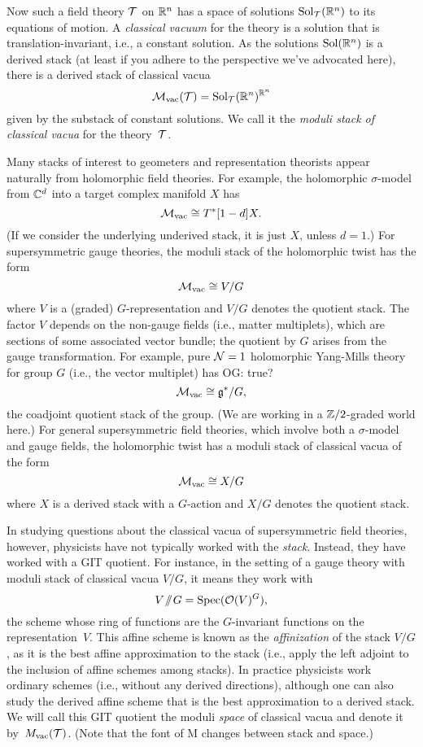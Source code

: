 \documentclass[11pt]{amsart}
\def\Sol{\text{Sol}}
\def\Spec{\text{Spec}}
\def\owen#1{{\textcolor{violet!65!black}{OG: {#1}}}}
\begin{document}
Now such a field theory $\mathcal T$ on $\mathbb R^n$ has a space of solutions $\Sol_\cT(\RR^n)$ to its equations of motion.
A {\em classical vacuum} for the theory is a solution that is translation-invariant,
i.e., a constant solution.
As the solutions $\Sol(\RR^n)$ is a derived stack (at least if you adhere to the perspective we've advocated here), there is a derived stack of classical vacua
\[
\cM_{\rm vac}(\cT) = \Sol_\cT(\RR^n)^{\RR^n}
\]
given by the substack of constant solutions.
We call it the {\em moduli stack of classical vacua} for the theory~$\mathcal T$.

Many stacks of interest to geometers and representation theorists appear naturally from holomorphic field theories.
For example, the holomorphic $\sigma$-model from $\mathbb C^d$ into a target complex manifold $X$ has
\[
\mathcal M_{\rm vac} \cong T^*[1-d]X.
\]
(If we consider the underlying underived stack, it is just $X$, unless $d = 1$.)
For supersymmetric gauge theories, the moduli stack of the holomorphic twist has the form
\[
\mathcal M_{\rm vac} \cong V/G
\]
where $V$ is a (graded) $G$-representation and $V/G$ denotes the quotient stack.
The factor $V$ depends on the non-gauge fields (i.e., matter multiplets), which are sections of some associated vector bundle;
the quotient by $G$ arises from the gauge transformation.
For example, pure $\mathcal N =1$ holomorphic Yang-Mills theory for group $G$ (i.e., the vector multiplet) has \owen{true?}
\[
\mathcal M_{\rm vac} \cong \mathfrak g^*/G,
\]
the coadjoint quotient stack of the group.
(We are working in a $\mathbb Z/2$-graded world here.)
For general supersymmetric field theories, which involve both a $\sigma$-model and gauge fields, the holomorphic twist has a moduli stack of classical vacua of the form
\[
\mathcal M_{\rm vac} \cong X/G
\]
where $X$ is a derived stack with a $G$-action and $X/G$ denotes the quotient stack.

In studying questions about the classical vacua of supersymmetric field theories, however, physicists have not typically worked with the {\em stack}.
Instead, they have worked with a GIT quotient.
For instance, in the setting of a gauge theory with moduli stack of classical vacua $V/G$, it means they work with
\[
V\Sslash G = \Spec(\cO(V)^G),
\]
the scheme whose ring of functions are the $G$-invariant functions on the representation~$V$.
This affine scheme is known as the {\em affinization} of the stack $V/G$, as it is the best affine approximation to the stack (i.e., apply the left adjoint to the inclusion of affine schemes among stacks).
In practice physicists work ordinary schemes (i.e., without any derived directions), although one can also study the derived affine scheme that is the best approximation to a derived stack.
We will call this GIT quotient the moduli {\em space} of classical vacua and denote it by~$M_{\rm vac}(\mathcal T)$.
(Note that the font of M changes between stack and space.)
\end{document}
